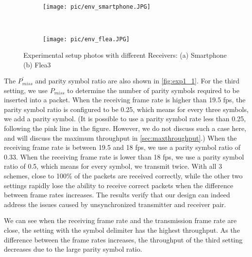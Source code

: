 \begin{figure}[!t]
\centering
  \begin{subfigure}[h]{0.2\textwidth}
  \texttt{[image: pic/env\_smartphone.JPG]}
  \caption{}
  \end{subfigure}
  ~ 
  \begin{subfigure}[h]{0.2\textwidth}
  \texttt{[image: pic/env\_flea.JPG]}
  \caption{}
  \end{subfigure}
\caption{Experimental setup photos with different Receivers: (a) Smartphone (b) Flea3}
\label{fig:exp1_setup}
\end{figure}

The $P_{miss}^ \prime$ and parity symbol ratio are also shown in \autoref{fig:exp1_1}. 
For the third setting, we use $P_{miss}$ to determine the number of parity symbols required to be inserted into a packet. When the receiving frame rate is higher than 19.5 fps, the parity symbol ratio is configured to be 0.25, which means for every three symbols, we add a parity symbol. (It is possible to use a parity symbol rate less than 0.25, following the pink line in the figure. However, we do not discuss such a case here, and will discuss the maximum throughput in \autoref{sec:maxthroughput}.) When the receiving frame rate is between 19.5 and 18 fps, we use a parity symbol ratio of 0.33. When the receiving frame rate is lower than 18 fps, we use a parity symbol ratio of 0.5, which means for every symbol, we transmit twice.
With all 3 schemes, close to 100\% of the packets are received correctly, while the other two settings rapidly lose the ability to receive correct packets when the difference between frame rates increases. The results verify that our design can indeed address the issues caused by unsynchronized transmitter and receiver pair. 

We can see when the receiving frame rate and the transmission frame rate are close, the setting with the symbol delimiter has the highest throughput. As the difference between the frame rates increases, the throughput of the third setting decreases due to the large parity symbol ratio.

